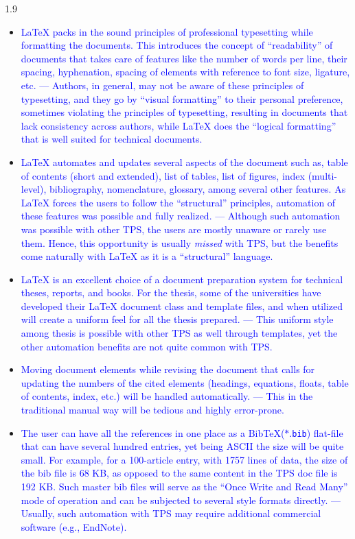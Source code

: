 \documentclass[phd]{ndsu-thesis-2022}
\newcommand\myspacing{1.9} %
\newcommand\italk[1]{\textcolor{blue}{#1}}  %
\newcommand\lx{\LaTeX\xspace}
\newcommand\bx{Bib\!\TeX\xspace}
\newcommand\vb[1]{\textcolor{blue}{\texttt{#1}}}%
\begin{document}
\begin{spacing}{\myspacing}
\begin{itemize}[leftmargin=*, itemsep=0pt, parsep=3pt]
\item \italk{\lx packs in the sound principles of professional typesetting while formatting the documents. This introduces the concept of ``readability'' of documents that takes care of features like the number of words per line, their spacing, hyphenation, spacing of elements with reference to font size, ligature, etc. --- Authors, in general, may not be aware of these principles of typesetting, and they go by ``visual formatting'' to their personal preference, sometimes violating the principles of typesetting, resulting in documents that lack consistency across authors, while \lx does the ``logical formatting'' that is well suited for technical documents.} 

\item \italk{\lx automates and updates several aspects of the document such as, table of contents (short and extended), list of tables, list of figures, index (multi-level), bibliography, nomenclature, glossary, among several other features. As \lx forces the users to follow the ``structural'' principles, automation of these features was possible and fully realized. --- Although such automation was possible with other TPS, the users are mostly unaware or rarely use them. Hence, this opportunity is usually \emph{missed} with TPS, but the benefits come naturally with \lx as it is a ``structural'' language.}

\item \italk{\lx is an excellent choice of a document preparation system for technical theses, reports, and books.  For the thesis, some of the universities have developed their \lx document class and template files, and when utilized will create a uniform feel for all the thesis prepared. --- This uniform style among thesis is possible with other TPS as well through templates, yet the other automation benefits are not quite common with TPS.}  

\item \italk{Moving document elements while revising the document that calls for updating the numbers of the cited elements (headings, equations, floats, table of contents, index, etc.) will be handled automatically. --- This in the traditional manual way will be tedious and highly error-prone.}   

\item \italk{The user can have all the references in one place as a \bx  ($\ast$.\vb{bib}) flat-file that can have several hundred entries, yet being ASCII the size will be quite small. For example, for a 100-article entry, with 1757 lines of data, the size of the bib file is 68 KB, as opposed to the same content in the TPS doc file is 192 KB. Such master bib files will serve as the ``Once Write and Read Many'' mode of operation and can be subjected to several style formats directly. --- Usually, such automation with TPS may require additional commercial software (e.g., EndNote).} 


\end{itemize}
\end{spacing}
\end{document}

